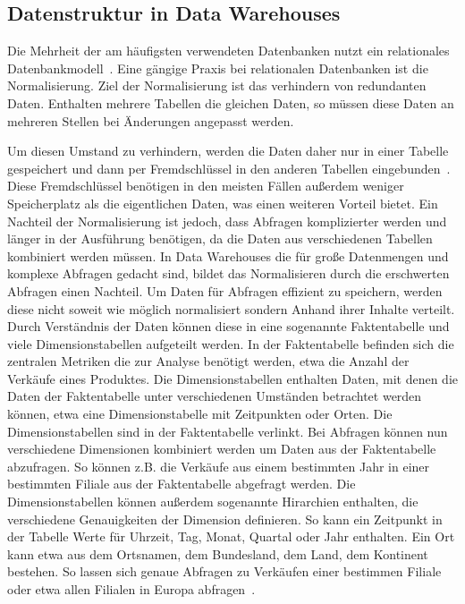 \subsection{Datenstruktur in Data Warehouses}
Die Mehrheit der am häufigsten verwendeten Datenbanken nutzt ein relationales Datenbankmodell~\cite{db-engines_most_2023}. 
Eine gängige Praxis bei relationalen Datenbanken ist die Normalisierung.
Ziel der Normalisierung ist das verhindern von redundanten Daten.
Enthalten mehrere Tabellen die gleichen Daten, so müssen diese Daten an mehreren Stellen bei Änderungen angepasst werden.

Um diesen Umstand zu verhindern, werden die Daten daher nur in einer Tabelle gespeichert und dann per Fremdschlüssel in den anderen Tabellen eingebunden~\cite[s. 24 - 25]{vaisman_data_2022}.
Diese Fremdschlüssel benötigen in den meisten Fällen außerdem weniger Speicherplatz als die eigentlichen Daten, was einen weiteren Vorteil bietet.
Ein Nachteil der Normalisierung ist jedoch, dass Abfragen komplizierter werden und länger in der Ausführung benötigen, da die Daten aus verschiedenen Tabellen kombiniert werden müssen.
In Data Warehouses die für große Datenmengen und komplexe Abfragen gedacht sind, bildet das Normalisieren durch die erschwerten Abfragen einen Nachteil.
Um Daten für Abfragen effizient zu speichern, werden diese nicht soweit wie möglich normalisiert sondern Anhand ihrer Inhalte verteilt. 
Durch Verständnis der Daten können diese in eine sogenannte Faktentabelle und viele Dimensionstabellen aufgeteilt werden. In der Faktentabelle befinden sich die zentralen Metriken die zur Analyse benötigt werden, etwa die Anzahl der Verkäufe eines Produktes.
Die Dimensionstabellen enthalten Daten, mit denen die Daten der Faktentabelle unter verschiedenen Umständen betrachtet werden können, etwa eine Dimensionstabelle mit Zeitpunkten oder Orten.
Die Dimensionstabellen sind in der Faktentabelle verlinkt.
Bei Abfragen können nun verschiedene Dimensionen kombiniert werden um Daten aus der Faktentabelle abzufragen.
So können z.B. die Verkäufe aus einem bestimmten Jahr in einer bestimmten Filiale aus der Faktentabelle abgefragt werden.
Die Dimensionstabellen können außerdem sogenannte Hirarchien enthalten, die verschiedene Genauigkeiten der Dimension definieren.
So kann ein Zeitpunkt in der Tabelle Werte für Uhrzeit, Tag, Monat, Quartal oder Jahr enthalten.
Ein Ort kann etwa aus dem Ortsnamen, dem Bundesland, dem Land, dem Kontinent bestehen.
So lassen sich genaue Abfragen zu Verkäufen einer bestimmen Filiale oder etwa allen Filialen in Europa abfragen~\cite[s. 5]{vaisman_data_2022}.

